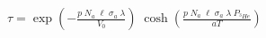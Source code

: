 


\begin{eqnarray*}
  \tau = \exp \left(-\frac{p \; N_a \; \ell \; \sigma_a \; \lambda}{V_0} \right) \; \cosh \left( \frac{p \; N_a \; \ell \; \sigma_a \; \lambda \;  P_{^{3}He}}{a T} \right)
\end{eqnarray*}

